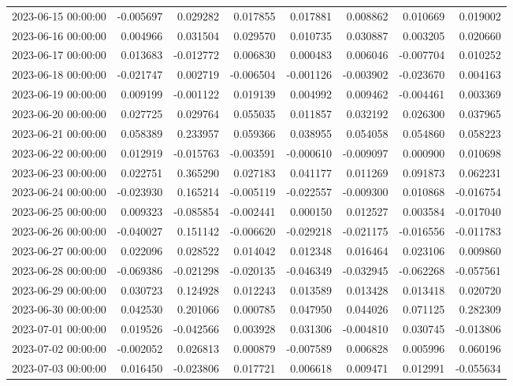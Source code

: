 \begin{tabular}{lrrrrrrr}
2023-06-15 00:00:00 & -0.005697 & 0.029282 & 0.017855 & 0.017881 & 0.008862 & 0.010669 & 0.019002 \\
2023-06-16 00:00:00 & 0.004966 & 0.031504 & 0.029570 & 0.010735 & 0.030887 & 0.003205 & 0.020660 \\
2023-06-17 00:00:00 & 0.013683 & -0.012772 & 0.006830 & 0.000483 & 0.006046 & -0.007704 & 0.010252 \\
2023-06-18 00:00:00 & -0.021747 & 0.002719 & -0.006504 & -0.001126 & -0.003902 & -0.023670 & 0.004163 \\
2023-06-19 00:00:00 & 0.009199 & -0.001122 & 0.019139 & 0.004992 & 0.009462 & -0.004461 & 0.003369 \\
2023-06-20 00:00:00 & 0.027725 & 0.029764 & 0.055035 & 0.011857 & 0.032192 & 0.026300 & 0.037965 \\
2023-06-21 00:00:00 & 0.058389 & 0.233957 & 0.059366 & 0.038955 & 0.054058 & 0.054860 & 0.058223 \\
2023-06-22 00:00:00 & 0.012919 & -0.015763 & -0.003591 & -0.000610 & -0.009097 & 0.000900 & 0.010698 \\
2023-06-23 00:00:00 & 0.022751 & 0.365290 & 0.027183 & 0.041177 & 0.011269 & 0.091873 & 0.062231 \\
2023-06-24 00:00:00 & -0.023930 & 0.165214 & -0.005119 & -0.022557 & -0.009300 & 0.010868 & -0.016754 \\
2023-06-25 00:00:00 & 0.009323 & -0.085854 & -0.002441 & 0.000150 & 0.012527 & 0.003584 & -0.017040 \\
2023-06-26 00:00:00 & -0.040027 & 0.151142 & -0.006620 & -0.029218 & -0.021175 & -0.016556 & -0.011783 \\
2023-06-27 00:00:00 & 0.022096 & 0.028522 & 0.014042 & 0.012348 & 0.016464 & 0.023106 & 0.009860 \\
2023-06-28 00:00:00 & -0.069386 & -0.021298 & -0.020135 & -0.046349 & -0.032945 & -0.062268 & -0.057561 \\
2023-06-29 00:00:00 & 0.030723 & 0.124928 & 0.012243 & 0.013589 & 0.013428 & 0.013418 & 0.020720 \\
2023-06-30 00:00:00 & 0.042530 & 0.201066 & 0.000785 & 0.047950 & 0.044026 & 0.071125 & 0.282309 \\
2023-07-01 00:00:00 & 0.019526 & -0.042566 & 0.003928 & 0.031306 & -0.004810 & 0.030745 & -0.013806 \\
2023-07-02 00:00:00 & -0.002052 & 0.026813 & 0.000879 & -0.007589 & 0.006828 & 0.005996 & 0.060196 \\
2023-07-03 00:00:00 & 0.016450 & -0.023806 & 0.017721 & 0.006618 & 0.009471 & 0.012991 & -0.055634 \\

\end{tabular}
